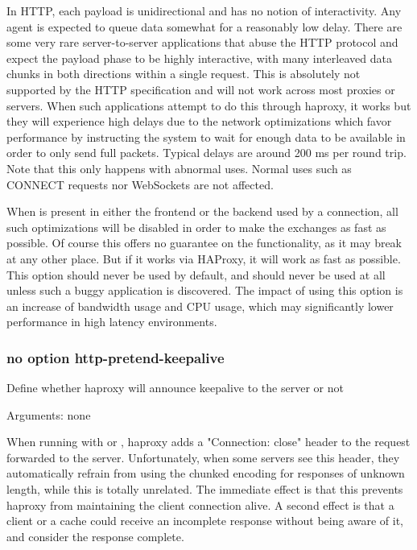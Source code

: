   In HTTP, each payload is unidirectional and has no notion of interactivity.
  Any agent is expected to queue data somewhat for a reasonably low delay.
  There are some very rare server-to-server applications that abuse the HTTP
  protocol and expect the payload phase to be highly interactive, with many
  interleaved data chunks in both directions within a single request. This is
  absolutely not supported by the HTTP specification and will not work across
  most proxies or servers. When such applications attempt to do this through
  haproxy, it works but they will experience high delays due to the network
  optimizations which favor performance by instructing the system to wait for
  enough data to be available in order to only send full packets. Typical
  delays are around 200 ms per round trip. Note that this only happens with
  abnormal uses. Normal uses such as CONNECT requests nor WebSockets are not
  affected.

  When  is present in either the frontend or the backend
  used by a connection, all such optimizations will be disabled in order to
  make the exchanges as fast as possible. Of course this offers no guarantee on
  the functionality, as it may break at any other place. But if it works via
  HAProxy, it will work as fast as possible. This option should never be used
  by default, and should never be used at all unless such a buggy application
  is discovered. The impact of using this option is an increase of bandwidth
  usage and CPU usage, which may significantly lower performance in high
  latency environments.

\subsubsection[http-pretend-keepalive]{}
\subsubsection*{no option http-pretend-keepalive}


  Define whether haproxy will announce keepalive to the server or not


  Arguments: none

  When running with  or , haproxy
  adds a "Connection: close" header to the request forwarded to the server.
  Unfortunately, when some servers see this header, they automatically refrain
  from using the chunked encoding for responses of unknown length, while this
  is totally unrelated. The immediate effect is that this prevents haproxy from
  maintaining the client connection alive. A second effect is that a client or
  a cache could receive an incomplete response without being aware of it, and
  consider the response complete.

